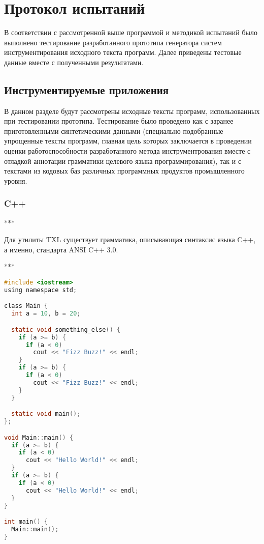 \section{Протокол испытаний}

В соответствии с рассмотренной выше программой и методикой испытаний было выполнено тестирование разработанного прототипа генератора систем инструментирования исходного текста программ.
Далее приведены тестовые данные вместе с полученными результатами.

\subsection{Инструментируемые приложения}

В данном разделе будут рассмотрены исходные тексты программ, использованных при тестировании прототипа.
Тестирование было проведено как с заранее приготовленными синтетическими данными (специально подобранные упрощенные тексты программ, главная цель которых заключается в проведении оценки работоспособности разработанного метода инструментрования вместе с отладкой аннотации грамматики целевого языка программирования), так и с текстами из кодовых баз различных программных продуктов промышленного уровня.

\subsubsection{C++}

***

Для утилиты TXL существует грамматика, описывающая синтаксис языка C++, а именно, стандарта ANSI C++ 3.0.

***

\begin{lstlisting}[frame=single, language=C, label={test-c}, caption={Исходный текст тестового приложения.}]
#include <iostream>
using namespace std;

class Main {
  int a = 10, b = 20;

  static void something_else() {
    if (a >= b) {
      if (a < 0)
        cout << "Fizz Buzz!" << endl;
    }
    if (a >= b) {
      if (a < 0)
        cout << "Fizz Buzz!" << endl;
    }
  }

  static void main();
};

void Main::main() {
  if (a >= b) {
    if (a < 0)
      cout << "Hello World!" << endl;
  }
  if (a >= b) {
    if (a < 0)
      cout << "Hello World!" << endl;
  }
}

int main() {
  Main::main();
}
\end{lstlisting}

